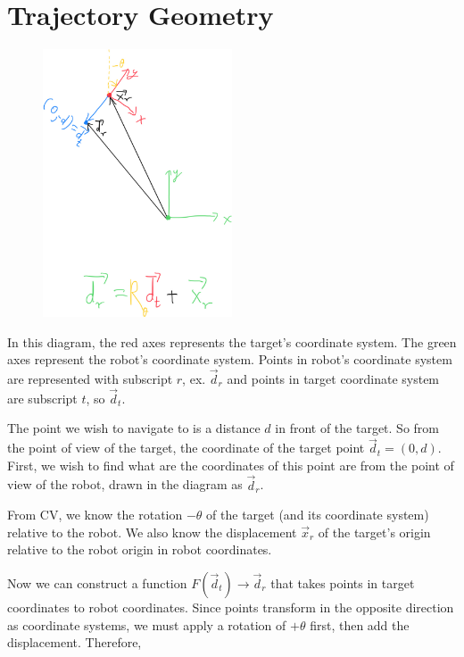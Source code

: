 \documentclass[12pt, oneside]{article}
\begin{document}
\section{Trajectory Geometry}

\begin{figure}[H]
\includegraphics[width=0.5\textwidth]{Diagram.jpeg}
\centering
\end{figure}

In this diagram, the red axes represents the target's coordinate system. The green axes represent the robot's coordinate system. Points in robot's coordinate system are represented with subscript $r$, ex. $\vec{d}_r$ and points in target coordinate system are subscript $t$, so $\vec{d}_t$. 

The point we wish to navigate to is a distance $d$ in front of the target. So from the point of view of the target, the coordinate of the target point $\vec{d}_t = (0, d)$. First, we wish to find what are the coordinates of this point are from the point of view of the robot, drawn in the diagram as $\vec{d}_r$.

From CV, we know the rotation $-\theta$ of the target (and its coordinate system) relative to the robot. We also know the displacement $\vec{x}_r$ of the target's origin relative to the robot origin in robot coordinates.

Now we can construct a function $F(\vec{d}_t) \rightarrow \vec{d}_r$ that takes points in target coordinates to robot coordinates. Since points transform in the opposite direction as coordinate systems, we must apply a rotation of $+\theta$ first, then add the displacement. Therefore,
\end{document}
